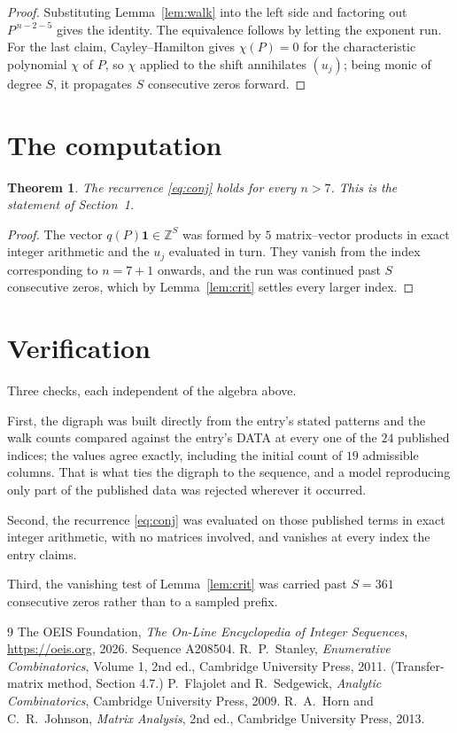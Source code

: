 \documentclass[11pt,a4paper]{article}
\theoremstyle{plain}
\newtheorem{theorem}{Theorem}
\theoremstyle{definition}
\begin{document}
\begin{proof}
Substituting Lemma~\ref{lem:walk} into the left side and factoring out
$P^{\,n-2-5}$ gives the identity. The equivalence follows by letting the exponent
run. For the last claim, Cayley--Hamilton gives $\chi(P)=0$ for the characteristic
polynomial $\chi$ of $P$, so $\chi$ applied to the shift annihilates $(u_j)$; being monic of
degree $S$, it propagates $S$ consecutive zeros forward.
\end{proof}

\section{The computation}

\begin{theorem}
The recurrence \eqref{eq:conj} holds for every $n>7$. This is the statement of
Section~1.
\end{theorem}

\begin{proof}
The vector $q(P)\mathbf{1}\in\mathbb{Z}^{S}$ was formed by $5$ matrix--vector
products in exact integer arithmetic and the $u_j$ evaluated in turn. They vanish from the
index corresponding to $n=7+1$ onwards, and the run was continued past $S$ consecutive
zeros, which by Lemma~\ref{lem:crit} settles every larger index.
\end{proof}

\section{Verification}

Three checks, each independent of the algebra above.

First, the digraph was built directly from the entry's stated patterns and the walk counts
compared against the entry's DATA at every one of the $24$ published indices; the
values agree exactly, including the initial count of $19$ admissible columns. That is
what ties the digraph to the sequence, and a model reproducing only part of the published
data was rejected wherever it occurred.

Second, the recurrence \eqref{eq:conj} was evaluated on those published terms in exact
integer arithmetic, with no matrices involved, and vanishes at every index the entry claims.

Third, the vanishing test of Lemma~\ref{lem:crit} was carried past $S=361$ consecutive
zeros rather than to a sampled prefix.

\begin{thebibliography}{9}
 The OEIS Foundation, \emph{The On-Line Encyclopedia of Integer
Sequences}, \url{https://oeis.org}, 2026. Sequence A208504.
 R.~P.~Stanley, \emph{Enumerative Combinatorics}, Volume 1, 2nd ed.,
Cambridge University Press, 2011. (Transfer-matrix method, Section 4.7.)
 P.~Flajolet and R.~Sedgewick, \emph{Analytic Combinatorics}, Cambridge
University Press, 2009.
 R.~A.~Horn and C.~R.~Johnson, \emph{Matrix Analysis}, 2nd ed., Cambridge
University Press, 2013.
\end{thebibliography}
\end{document}
